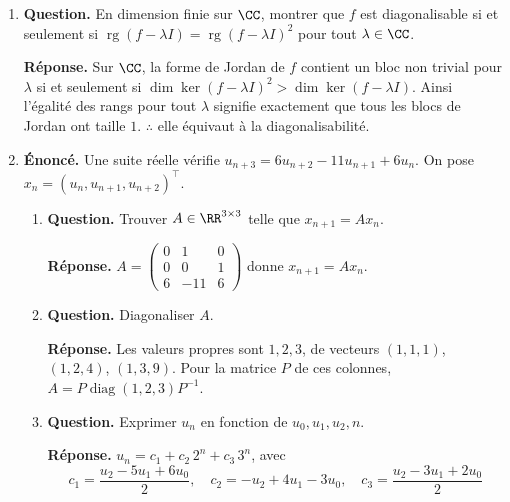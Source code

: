 \documentclass[12pt, a4paper]{article}
\begin{document}
\begin{enumerate}[label=9.\arabic*., start=94]
\begin{minipage}[t]{\linewidth}
\begin{enumerate}[\arabic*.]
  \item \textbf{Question.} Trouver $S$ telle que $S^2=R$.
\par\smallskip
\textbf{Réponse.} Posons $P=J/n$ : c'est un projecteur.
        $R=(n-1)P-(I_n-P)$, donc
        $S=\sqrt{n-1}\,P+i(I_n-P)$ vérifie $S^2=R$.
        Pour $n=1$, cette formule donne $S=0$.

\end{enumerate}
\end{minipage}

  \item \begin{minipage}[t]{\linewidth}\raggedright
\textbf{Question.} En dimension finie sur $\CC$, montrer que $f$ est diagonalisable si et seulement si $\operatorname{rg}(f-\lambda I)=\operatorname{rg}(f-\lambda I)^2$ pour tout $\lambda\in\CC$.
\par\smallskip
\textbf{Réponse.} Sur $\CC$, la forme de Jordan de $f$ contient un bloc non trivial pour $\lambda$ si et seulement si
    $\dim\ker(f-\lambda I)^2>\dim\ker(f-\lambda I)$.
    Ainsi l'égalité des rangs pour tout $\lambda$ signifie exactement que tous les blocs de Jordan ont taille $1$.
    $\therefore$ elle équivaut à la diagonalisabilité.
\end{minipage}

  \item \begin{minipage}[t]{\linewidth}\raggedright
\textbf{Énoncé.} Une suite réelle vérifie $u_{n+3}=6u_{n+2}-11u_{n+1}+6u_n$. On pose $x_n=(u_n,u_{n+1},u_{n+2})^\top$.

\begin{enumerate}[\arabic*.]
        \item \textbf{Question.} Trouver $A\in\RR^{3\times3}$ telle que $x_{n+1}=Ax_n$.
\par\smallskip
\textbf{Réponse.} $\displaystyle A=\begin{pmatrix}0&1&0\\0&0&1\\6&-11&6\end{pmatrix}$ donne $x_{n+1}=Ax_n$.

  \item \textbf{Question.} Diagonaliser $A$.
\par\smallskip
\textbf{Réponse.} Les valeurs propres sont $1,2,3$, de vecteurs $(1,1,1)$, $(1,2,4)$, $(1,3,9)$.
        Pour la matrice $P$ de ces colonnes, $A=P\operatorname{diag}(1,2,3)P^{-1}$.

  \item \textbf{Question.} Exprimer $u_n$ en fonction de $u_0,u_1,u_2,n$.
\par\smallskip
\textbf{Réponse.} $u_n=c_1+c_2\,2^n+c_3\,3^n$, avec
        \[
          c_1=\frac{u_2-5u_1+6u_0}{2},\quad
          c_2=-u_2+4u_1-3u_0,\quad c_3=\frac{u_2-3u_1+2u_0}{2}
        \]


\end{enumerate}
\end{minipage}
\end{enumerate}
\end{document}
